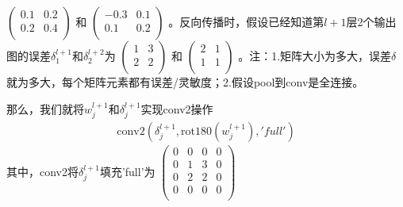            \begin{math}
            \left(
            \begin{smallmatrix}
            0.1 & 0.2 \\
            0.2 & 0.4\\
            \end{smallmatrix}
            \right)
            \end{math}
            和
            \begin{math}
            \left(
            \begin{smallmatrix}
            -0.3 & 0.1 \\
            0.1 & 0.2\\
            \end{smallmatrix}
            \right)
            \end{math}
            。反向传播时，假设已经知道第$l+1$层2个输出图的误差$\delta_1^{l+1}$和$\delta_2^{l+2}$为
            \begin{math}
            \left(
            \begin{smallmatrix}
            1& 3 \\
            2& 2\\
            \end{smallmatrix}
            \right)
            \end{math}
            和
            \begin{math}
            \left(
            \begin{smallmatrix}
            2& 1 \\
            1& 1\\
            \end{smallmatrix}
            \right)
            \end{math}
            。注：1.矩阵大小为多大，误差$\delta$就为多大，每个矩阵元素都有误差/灵敏度；2.假设pool到conv是全连接。
            \par
            那么，我们就将$w_j^{l+1}$和$\delta_j^{l+1}$实现conv2操作
            \begin{align*}
            \mathrm{conv2}(\delta_j^{l+1},\mathrm{rot180}(w_j^{l+1}),'full')
            \end{align*}
            其中，conv2将$\delta_j^{l+1}$填充'full'为
            \begin{math}
            \left(
            \begin{smallmatrix}
            0 & 0 & 0 & 0\\
            0 & 1 & 3 & 0\\
            0 & 2 & 2 & 0\\
            0 & 0 & 0 & 0\\
            \end{smallmatrix}
            \right)
            \end{math}

